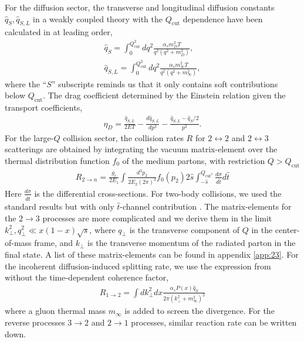 \documentclass[aps, prc, reprint, amsmath, groupedaddress, nofootinbib]{revtex4-1}
\begin{document}
For the diffusion sector, the transverse and longitudinal diffusion constants $\hat{q}_S, \hat{q}_{S,L}$ in a weakly coupled theory with the $Q_{\textrm{cut}}$ dependence have been calculated in \cite{Ghiglieri:2015ala} at leading order,
\begin{eqnarray}
\hat{q}_S = \int_0^{Q_{\textrm{cut}}^2} dq^2 \frac{\alpha_s m_D^2 T}{q^2 (q^2+m_D^2)},
\label{eq:qS} \\
\hat{q}_{S,L} = \int_0^{Q_{\textrm{cut}}^2} dq^2 \frac{\alpha_s m_\infty^2 T}{q^2 (q^2+m_\infty^2)}
\label{eq:qSL}, 
\end{eqnarray}
where the ``$S$'' subscripts reminds us that it only contains soft contributions below $Q_{\textrm{cut}}$.
The drag coefficient determined by the Einstein relation given the transport coefficients,
\begin{eqnarray}
\eta_D = \frac{\hat{q}_{S,L}}{2ET} - \frac{d\hat{q}_{S,L}}{dp^2} - \frac{\hat{q}_{S,L} - \hat{q}_S/2}{p^2}.
\end{eqnarray}
For the large-$Q$ collision sector, the collision rates $R$ for  $2\leftrightarrow2$ and $2\leftrightarrow3$ scatterings are obtained by integrating the vacuum matrix-element over the thermal distribution function $f_0$ of the medium partons, with restriction $Q > Q_{\textrm{cut}}$
\begin{eqnarray}
R_{2\rightarrow n} = \frac{g_i}{2E_1}\int  \frac{d^3p_2}{2E_2(2\pi)^3} f_0(p_2)2\hat{s} \int_{-\hat{s}}^{Q_{\textrm{cut}^2}}\frac{d\sigma}{d\hat{t}}d\hat{t}
\end{eqnarray}
Here $\frac{d\sigma}{d\hat{t}}$ is the differential cross-sections. 
For two-body collisions, we used the standard results but with only $\hat{t}$-channel contribution \cite{RevModPhys.59.465}.
The matrix-elements for the $2\rightarrow 3$ processes are more complicated and we derive them in the limit $k_\perp^2, q_\perp^2 \ll x(1-x)\sqrt{s}$, where $q_\perp$ is the transverse component of $Q$ in the center-of-mass frame, and $k_\perp$ is the transverse momentum of the radiated parton in the final state. 
A list of these matrix-elements can be found in appendix \ref{app:23}.
For the incoherent diffusion-induced splitting rate, we use the expression from \cite{Cao:2017hhk} without the time-dependent coherence factor,
\begin{eqnarray}
R_{1\rightarrow 2} = \int d k_\perp^2 dx \frac{\alpha_s P(x) \hat{q}_S}{2\pi (k_\perp^2 + m_\infty^2)^2}
\end{eqnarray}
where a gluon thermal mass $m_\infty$ is added to screen the divergence.
For the reverse processes $3\rightarrow 2$  and $2\rightarrow 1$ processes, similar reaction rate can be written down.
\end{document}
